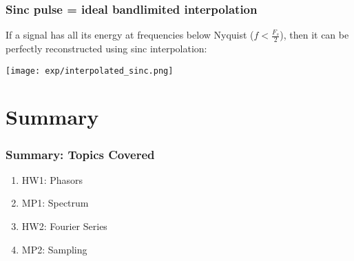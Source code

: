 \documentclass{beamer}
\begin{document}
\begin{frame}
  \frametitle{Sinc pulse = ideal bandlimited interpolation}

  If a signal has all its energy at frequencies below Nyquist ($f< \frac{F_s}{2}$), then
  it can be perfectly reconstructed using sinc interpolation:

  \centerline{\texttt{[image: exp/interpolated\_sinc.png]}}  
\end{frame}


\section[Summary]{Summary}
\setcounter{subsection}{1}

\begin{frame}
  \frametitle{Summary: Topics Covered}

  \begin{enumerate}
  \item HW1: Phasors
  \item MP1: Spectrum
  \item HW2: Fourier Series
  \item MP2: Sampling
  \end{enumerate}
\end{frame}
\end{document}
